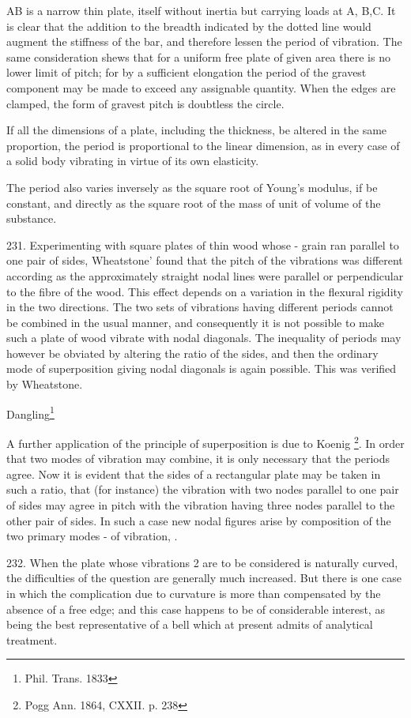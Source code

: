 AB is a narrow thin plate, itself without inertia but carrying loads at
A, B,C. It is clear that the addition to the breadth
indicated by the dotted line would augment the stiffness of the bar, and
therefore lessen the period of vibration. The same consideration shews
that for a uniform free plate of given area there is no lower limit of
pitch; for by a sufficient elongation the period of the gravest
component may be made to exceed any assignable quantity. When the edges
are clamped, the form of gravest pitch is doubtless the circle.

If all the dimensions of a plate, including the thickness, be altered in
the same proportion, the period is proportional to the linear dimension,
as in every case of a solid body vibrating in virtue of its own
elasticity.

The period also varies inversely as the square root of Young's modulus,
if be constant, and directly as the square root of the mass of unit of
volume of the substance.

231. Experimenting with square plates of thin wood whose - grain ran
parallel to one pair of sides, Wheatstone' found that the pitch of the
vibrations was different according as the approximately straight nodal
lines were parallel or perpendicular to the fibre of the wood. This
effect depends on a variation in the flexural rigidity in the two
directions. The two sets of vibrations having different periods cannot
be combined in the usual manner, and consequently it is not possible to
make such a plate of wood vibrate with nodal diagonals. The inequality
of periods may however be obviated by altering the ratio of the sides,
and then the ordinary mode of superposition giving nodal diagonals is
again possible. This was verified by Wheatstone.

Dangling\footnote{ Phil. Trans. 1833}

A further application of the principle of superposition is due to Koenig
\footnote{Pogg Ann. 1864, CXXII. p. 238}. In order that two modes of
vibration may combine, it is only necessary that the periods agree. Now
it is evident that the sides of a rectangular plate may be taken in such
a ratio, that (for instance) the vibration with two nodes parallel to
one pair of sides may agree in pitch with the vibration having three
nodes parallel to the other pair of sides. In such a case new nodal
figures arise by composition of the two primary modes - of vibration, .

232. When the plate whose vibrations 2 are to be considered is naturally
curved, the difficulties of the question are generally much increased.
But there is one case in which the complication due to curvature is more
than compensated by the absence of a free edge; and this case happens to
be of considerable interest, as being the best representative of a bell
which at present admits of analytical treatment.

